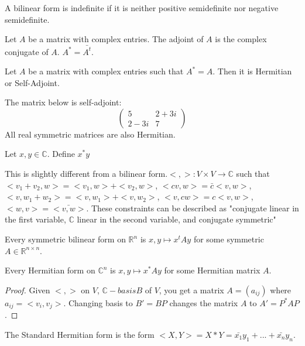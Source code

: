\documentclass{article}
\newcommand{\C}{\mathbb{C}}
\newcommand{\R}{\mathbb{R}}
\newcommand{\ra}[1][]{\xrightarrow{#1}}
\begin{document}
\begin{definition}
A bilinear form is indefinite if it is neither positive semidefinite nor negative semidefinite.
\end{definition}
\begin{definition}
Let $A$ be a matrix with complex entries. The adjoint of $A$ is the complex conjugate of $A$. $A^*=\bar{A^t}$.
\end{definition}
\begin{definition}
Let $A$ be a matrix with complex entries such that $A^*=A$. Then it is Hermitian or Self-Adjoint.
\end{definition}
\begin{example}
The matrix below is self-adjoint:
$$\begin{pmatrix}
5&2+3i\\2-3i&7
\end{pmatrix}$$
All real symmetric matrices are also Hermitian.
\end{example}
Let $x,y\in \C$. Define $x^*y$
\begin{definition}
This is slightly different from a bilinear form.$<,>:V\times V\ra \C$ such that $<v_1+v_2,w>=<v_1,w>+<v_2,w>$, $<cv,w>=\bar{c}<v,w>$, $<v,w_1+w_2>=<v,w_1>+<v,w_2>$, $<v,cw>=c<v,w>$, $<w,v>=\bar{<v,w>}$. These constraints can be described as "conjugate linear in the first variable, $\C$ linear in the second variable, and conjugate symmetric"
\end{definition}
\begin{definition}
Every symmetric bilinear form on $\R^n$ is $x,y\mapsto x^tAy$ for some symmetric $A\in \R^{n\times n}$.
\end{definition}
\begin{proposition}
Every Hermitian form on $\C^n$ is $x,y\mapsto x^*Ay$ for some Hermitian matrix $A$.
\end{proposition}
\begin{proof}
Given $<,>$ on $V$, $\C-basis B$ of $V$, you get a matrix $A=(a_{ij})$ where $a_{ij}=<v_i,v_j>$. Changing basis to $B'=BP$ changes the matrix $A$ to $A'=P^*AP$.
\end{proof}
\begin{definition}
The Standard Hermitian form is the form $<X,Y>=X*Y=\bar{x_1}y_1+...+\bar{x_n}y_n$.
\end{definition}
\end{document}
